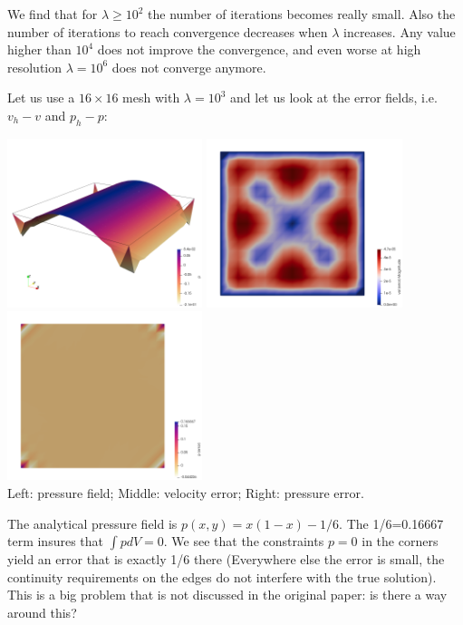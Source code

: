 We find that for $\lambda \ge 10^2$ the number of iterations becomes really small.
Also the number of iterations to reach convergence decreases when $\lambda$ increases. 
Any value higher than $10^4$ does not improve the convergence, and even worse
at high resolution $\lambda=10^6$ does not converge anymore. 

Let us use a $16\times 16$ mesh with $\lambda=10^3$ and let us look at the error fields, 
i.e. $v_h-v$ and $p_h-p$:
\begin{center}
\includegraphics[width=5.7cm]{python_codes/fieldstone_161/results/bench1/press2}
\includegraphics[width=5.7cm]{python_codes/fieldstone_161/results/bench1/vel_error}
\includegraphics[width=5.7cm]{python_codes/fieldstone_161/results/bench1/press_error}\\
{\captionfont Left: pressure field; Middle: velocity error; Right: pressure error.} 
\end{center}
The analytical pressure field is $p(x,y)=x(1-x)-1/6$. The 1/6=0.16667 term insures that $\int p dV=0$.
We see that the constraints $p=0$ in the corners yield an error that is exactly 1/6 there 
(Everywhere else the error is small, the continuity requirements on the edges do not interfere 
with the true solution). 
This is a big problem that is not discussed in the original paper: is there a way around this?

